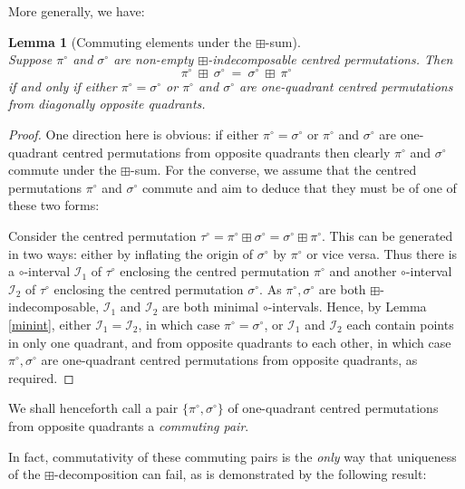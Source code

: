 \documentclass[11pt,a4paper]{article}
\newtheorem{lemma}[thm]{Lemma}
\theoremstyle{definition}
\begin{document}
More generally, we have:

\begin{lemma}[Commuting elements under the $\boxplus$-sum] \label{commuters}\ \\
Suppose $\pi^{\circ}$ and $\sigma^{\circ}$ are non-empty $\boxplus$-indecomposable centred permutations.
Then
\[
\pi^{\circ} \ \boxplus \ \sigma^{\circ} \ = \ \sigma^{\circ} \ \boxplus \ \pi^{\circ}
\]
if and only if either $\pi^{\circ} = \sigma^{\circ}$ or $\pi^{\circ}$ and $\sigma^{\circ}$ are one-quadrant centred permutations from diagonally opposite quadrants.
\end{lemma}

\begin{proof}

One direction here is obvious: if either $\pi^{\circ} = \sigma^{\circ}$ or $\pi^{\circ}$ and $\sigma^{\circ}$ are one-quadrant centred permutations from opposite quadrants then clearly $\pi^{\circ}$ and $\sigma^{\circ}$ commute under the $\boxplus$-sum. For the converse, we assume that the centred permutations $\pi^{\circ}$ and $\sigma^{\circ}$ commute and aim to deduce that they must be of one of these two forms:

Consider the centred permutation $\tau^{\circ} = \pi^{\circ} \boxplus \sigma^{\circ} = \sigma^{\circ} \boxplus \pi^{\circ}$. This can be generated in two ways: either by inflating the origin of $\sigma^{\circ}$ by $\pi^{\circ}$ or vice versa. Thus there is a $\circ$-interval $\mathcal{I}_{1}$ of $\tau^{\circ}$ enclosing the centred permutation $\pi^{\circ}$ and another $\circ$-interval $\mathcal{I}_{2}$ of $\tau^{\circ}$ enclosing the centred permutation $\sigma^{\circ}$. As $\pi^{\circ}, \sigma^{\circ}$ are both $\boxplus$-indecomposable, $\mathcal{I}_{1}$ and $\mathcal{I}_{2}$ are both minimal $\circ$-intervals. Hence, by Lemma \ref{minint}, either $\mathcal{I}_{1} = \mathcal{I}_{2}$, in which case $\pi^{\circ} = \sigma^{\circ}$, or $\mathcal{I}_{1}$ and $\mathcal{I}_{2}$ each contain points in only one quadrant, and from opposite quadrants to each other, in which case $\pi^{\circ},\sigma^{\circ}$ are one-quadrant centred permutations from opposite quadrants, as required.\end{proof}

We shall henceforth call a pair $\{\pi^{\circ},\sigma^{\circ}\}$ of one-quadrant centred permutations from opposite quadrants a \emph{commuting pair}.

In fact, commutativity of these commuting pairs is the \emph{only} way that uniqueness of the $\boxplus$-decomposition can fail, as is demonstrated by the following result:
\end{document}
